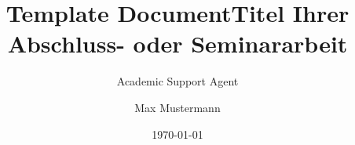 \documentclass{article}
\title{Template Document}
\author{Academic Support Agent}
\date{\today}
\begin{document}
\maketitle

\setcounter{secnumdepth}{2}
\title{Titel Ihrer Abschluss- oder Seminararbeit}
\address{im Studiengang Wirtschaftsinformatik an der\\Hochschule Trier}

\author{Max Mustermann}

\mytitlepage











\printbibliography

\begin{appendix}


\end{appendix}
\end{document}
